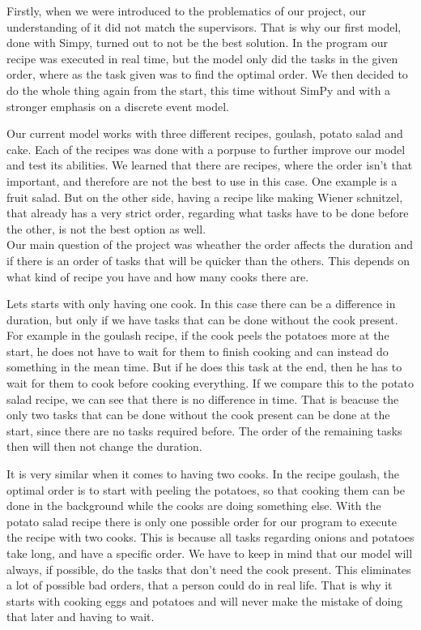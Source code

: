 
Firstly, when we were introduced to the problematics of our project, our understanding of it did not match the supervisors.
That is why our first model, done with Simpy, turned out to not be the best solution. In the program our recipe was executed in real time, but the model only
did the tasks in the given order, where as the task given was to find the optimal order. We then decided to do 
the whole thing again from the start, this time without SimPy and with a stronger emphasis on a discrete event model. 

Our current model works with three different recipes, goulash, potato salad and cake. Each of the recipes was done with a porpuse to further improve
our model and test its abilities. We learned that there are recipes, where the order isn't that important, and therefore are not the best 
to use in this case. One example is a fruit salad. But on the other side, having a recipe like making Wiener schnitzel, that already has a very strict order, regarding what tasks have 
to be done before the other, is not the best option as well. \\

Our main question of the project was wheather the order affects the duration and if there is an order of tasks 
that will be quicker than the others. This depends on what kind of recipe you have and how many cooks there are. 

Lets starts with only having one cook. In this case there can be a difference in duration, but only if we have 
tasks that can be done without the cook present. For example in the goulash recipe, if the cook peels the potatoes 
more at the start, he does not have to wait for them to finish cooking and can instead do something in the mean time. 
But if he does this task at the end, then he has to wait for them to cook before cooking everything. 
If we compare this to the potato salad recipe, we can see that there is no difference in time. That is beacuse the only two tasks
that can be done without the cook present can be done at the start, since there are no tasks required before. 
The order of the remaining tasks then will then not change the duration. 

It is very similar when it comes to having two cooks. In the recipe goulash, the optimal order is to start with 
peeling the potatoes, so that cooking them can be done in the background while the cooks are doing something else.   
With the potato salad recipe there is only one possible order for our program to execute the recipe with two cooks. 
This is because all tasks regarding onions and potatoes take long, and have a specific order. We have to keep in mind that our model will 
always, if possible, do the tasks that don't need the cook present. This eliminates a lot of possible 
bad orders, that a person could do in real life. That is why it starts with cooking eggs and potatoes and will 
never make the mistake of doing that later and having to wait. \\

